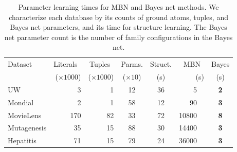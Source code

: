 \begin{table}[t]
\caption{Parameter learning times for MBN and Bayes net methods. 
We characterize each database by its counts of ground atoms, tuples,
and Bayes net parameters, and its time for structure learning. The Bayes net
parameter count is the number of family configurations in the Bayes
net.}
\begin{center}
\begin{tabular}{|l r r c c|r c|}
\hline
Dataset & Literals~ & Tuples~  & Parms. & Struct. & MBN~ & Bayes \\
& ($\times 1000$) & ($\times 1000$) & ($\times 10$) & (s) & {(s)\quad} & (s) \\\hline
UW & {3\quad} & {1\quad} & 12 & 36 & 5~~ & \bf{2} \\
Mondial & {2\quad} & {1\quad}  & 58 & 12 & 90~~ & \bf{3}\\
MovieLens & {170\quad} & {82\quad} & 33 & 72 & 10800~~ & \bf{8}\\
Mutagenesis & {35\quad} & {15\quad} & 88 & 30 & 14400~~ & \bf{3}\\
Hepatitis & {71\quad} & {15\quad} & 79 & 24 & 36000~~ & \bf{3}\\\hline
\end{tabular}
\end{center}
\label{table:learn-times}
\end{table}
